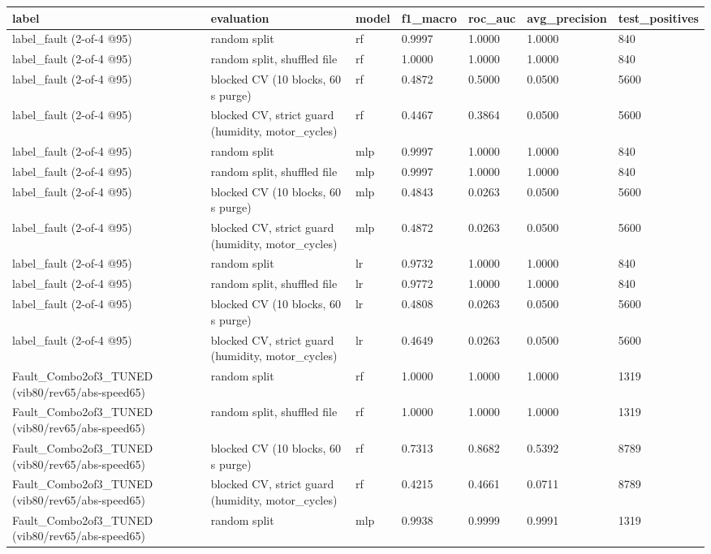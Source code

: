 \begin{tabular}{lllllll}
\toprule
label & evaluation & model & f1\_macro & roc\_auc & avg\_precision & test\_positives \\
\midrule
label\_fault (2-of-4 @95) & random split & rf & 0.9997 & 1.0000 & 1.0000 & 840 \\
label\_fault (2-of-4 @95) & random split, shuffled file & rf & 1.0000 & 1.0000 & 1.0000 & 840 \\
label\_fault (2-of-4 @95) & blocked CV (10 blocks, 60 s purge) & rf & 0.4872 & 0.5000 & 0.0500 & 5600 \\
label\_fault (2-of-4 @95) & blocked CV, strict guard (humidity, motor\_cycles) & rf & 0.4467 & 0.3864 & 0.0500 & 5600 \\
label\_fault (2-of-4 @95) & random split & mlp & 0.9997 & 1.0000 & 1.0000 & 840 \\
label\_fault (2-of-4 @95) & random split, shuffled file & mlp & 0.9997 & 1.0000 & 1.0000 & 840 \\
label\_fault (2-of-4 @95) & blocked CV (10 blocks, 60 s purge) & mlp & 0.4843 & 0.0263 & 0.0500 & 5600 \\
label\_fault (2-of-4 @95) & blocked CV, strict guard (humidity, motor\_cycles) & mlp & 0.4872 & 0.0263 & 0.0500 & 5600 \\
label\_fault (2-of-4 @95) & random split & lr & 0.9732 & 1.0000 & 1.0000 & 840 \\
label\_fault (2-of-4 @95) & random split, shuffled file & lr & 0.9772 & 1.0000 & 1.0000 & 840 \\
label\_fault (2-of-4 @95) & blocked CV (10 blocks, 60 s purge) & lr & 0.4808 & 0.0263 & 0.0500 & 5600 \\
label\_fault (2-of-4 @95) & blocked CV, strict guard (humidity, motor\_cycles) & lr & 0.4649 & 0.0263 & 0.0500 & 5600 \\
Fault\_Combo2of3\_TUNED (vib80/rev65/abs-speed65) & random split & rf & 1.0000 & 1.0000 & 1.0000 & 1319 \\
Fault\_Combo2of3\_TUNED (vib80/rev65/abs-speed65) & random split, shuffled file & rf & 1.0000 & 1.0000 & 1.0000 & 1319 \\
Fault\_Combo2of3\_TUNED (vib80/rev65/abs-speed65) & blocked CV (10 blocks, 60 s purge) & rf & 0.7313 & 0.8682 & 0.5392 & 8789 \\
Fault\_Combo2of3\_TUNED (vib80/rev65/abs-speed65) & blocked CV, strict guard (humidity, motor\_cycles) & rf & 0.4215 & 0.4661 & 0.0711 & 8789 \\
Fault\_Combo2of3\_TUNED (vib80/rev65/abs-speed65) & random split & mlp & 0.9938 & 0.9999 & 0.9991 & 1319 \\

\end{tabular}
